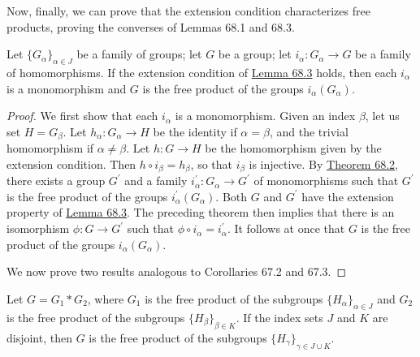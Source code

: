 Now, finally, we can prove that the extension condition characterizes free products, proving the converses of Lemmas 68.1 and 68.3.

\begin{lemma}
\label{lem:\thetheorem}
Let \({\{ G_{\alpha }\} }_{\alpha \in J}\) be a family of groups; let \(G\) be a group; let \(i_{\alpha } : G_{\alpha } \rightarrow G\) be a family of homomorphisms. If the extension condition of \hyperref[lem:68.3]{Lemma 68.3} holds, then each \(i_{\alpha }\) is a monomorphism and \(G\) is the free product of the groups \(i_{\alpha }( G_{\alpha })\).
\end{lemma}

\begin{proof}
We first show that each \(i_{\alpha }\) is a monomorphism. Given an index \(\beta\), let us set \(H = G_{\beta }\). Let \(h_{\alpha } : G_{\alpha } \rightarrow H\) be the identity if \(\alpha = \beta\), and the trivial homomorphism if \(\alpha \neq \beta\). Let \(h : G \rightarrow H\) be the homomorphism given by the extension condition. Then \(h \circ {i}_{\beta } = h_{\beta }\), so that \(i_{\beta }\) is injective.
By \hyperref[thm:68.2]{Theorem 68.2}, there exists a group \(G^{\prime }\) and a family \(i_{\alpha }^{\prime } : G_{\alpha } \rightarrow {G}^{\prime }\) of monomorphisms such that \(G^{\prime }\) is the free product of the groups \(i_{\alpha }^{\prime }( G_{\alpha })\). Both \(G\) and \(G^{\prime }\) have the extension property of \hyperref[lem:68.3]{Lemma 68.3}. The preceding theorem then implies that there is an isomorphism \(\phi : G \rightarrow {G}^{\prime }\) such that \(\phi \circ {i}_{\alpha } = i_{\alpha }^{\prime }\). It follows at once that \(G\) is the free product of the groups \(i_{\alpha }( G_{\alpha })\).

We now prove two results analogous to Corollaries 67.2 and 67.3.
\end{proof}
\begin{corollary}
\label{cor:\thetheorem}
Let \(G = G_{1} * G_{2}\), where \(G_{1}\) is the free product of the subgroups \({\{ H_{\alpha }\} }_{\alpha \in J}\) and \(G_{2}\) is the free product of the subgroups \({\{ H_{\beta }\} }_{\beta \in K}\). If the index sets \(J\) and \(K\) are disjoint, then \(G\) is the free product of the subgroups \({\{ H_{\gamma }\} }_{\gamma \in J \cup K}\).
\end{corollary}

